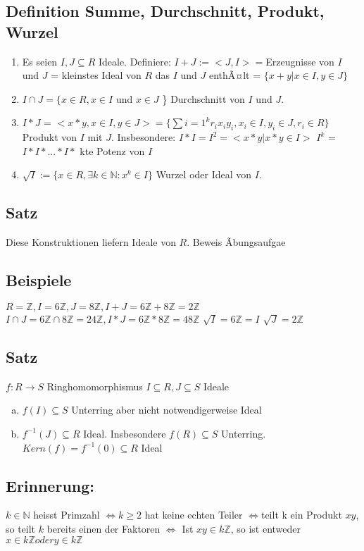 \documentclass[12pt,a4paper,ngerman]{scrreprt}
\begin{document}
\subsection{Definition Summe, Durchschnitt, Produkt, Wurzel}
\begin{enumerate}[]
\item Es seien $I,J \subseteq R$ Ideale. Definiere: $I+J := <J,I> = $Erzeugnisse von $I$ und $J$ = kleinstes Ideal von $R$ das $I$ und $J$ enthÃ¤lt
= $\{x+y | x \in I, y \in J\}$
\item $I \cap J = \{x \in R, x \in I$ und $x \in J$ \} Durchschnitt von $I$ und $J$.
\item $I*J$ = $<x*y, x\in I, y \in J> = \{\sum{i=1}^k r_ix_iy_i, x_i \in I, y_i \in J, r_i \in R\}$
Produkt von $I$ mit $J$. Insbesondere: $I*I = I^2 = <x*y | x*y\in I>$
$I^k$ = $I*I*...*I*$ kte Potenz von $I$
\item $\sqrt{I} :=\{x\in R, \exists k\in \mathbb{N}: x^k \in I\}$ Wurzel oder Ideal von $I$.
\end{enumerate}

\subsection{Satz}
Diese Konstruktionen liefern Ideale von $R$. Beweis Ãbungsaufgae
\subsection{Beispiele}
$R = \mathbb{Z}, I = 6\mathbb{Z}, J = 8\mathbb{Z}, I+J = 6\mathbb{Z} + 8\mathbb{Z} = 2 \mathbb{Z}$
$I \cap J = 6\mathbb{Z} \cap 8\mathbb{Z} = 24 \mathbb{Z}, I*J = 6\mathbb{Z}*8\mathbb{Z} = 48\mathbb{Z}$
$\sqrt{I} = 6\mathbb{Z} = I$ $\sqrt{J} = 2\mathbb{Z}$

\subsection{Satz}
$f: R\to S$ Ringhomomorphismus $I \subseteq R, J \subseteq S $ Ideale
\begin{enumerate}[(a)]
\item $f(I) \subseteq S$ Unterring aber nicht notwendigerweise Ideal
\item $f^{-1}(J) \subseteq R $ Ideal. Insbesondere $f(R) \subseteq S$ Unterring. $Kern(f) = f^{-1}(0) \subseteq R$ Ideal
\end{enumerate}

\subsection{Erinnerung:}
$k \in \mathbb{N}$ heisst Primzahl $\Leftrightarrow k \geq 2$ hat keine echten Teiler 
$\Leftrightarrow $teilt k ein Produkt $xy$, so teilt $k$ bereits einen der Faktoren 
$\Leftrightarrow$ Ist $xy \in k \mathbb{Z}$, so ist entweder $x \in k \mathbb{Z} oder y \in k \mathbb{Z}$
\end{document}
